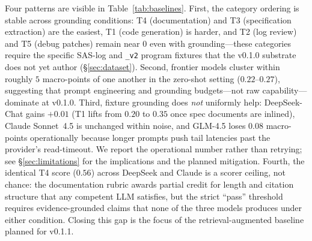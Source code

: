 Four patterns are visible in Table~\ref{tab:baselines}. First, the
category ordering is stable across grounding conditions: T4
(documentation) and T3 (specification extraction) are the easiest, T1
(code generation) is harder, and T2 (log review) and T5 (debug patches)
remain near $0$ even with grounding---these categories require the
specific SAS-log and \texttt{\_v2} program fixtures that the v0.1.0
substrate does not yet author (\S\ref{sec:dataset}). Second, frontier
models cluster within roughly $5$ macro-points of one another in the
zero-shot setting (\(0.22\)--\(0.27\)), suggesting that prompt
engineering and grounding budgets---not raw capability---dominate at
v0.1.0. Third, fixture grounding does \emph{not} uniformly help:
DeepSeek-Chat gains $+0.01$ (T1 lifts from $0.20$ to $0.35$ once spec
documents are inlined), Claude Sonnet~4.5 is unchanged within noise, and
GLM-4.5 loses $0.08$ macro-points operationally because longer prompts
push tail latencies past the provider's read-timeout. We report the
operational number rather than retrying; see \S\ref{sec:limitations} for
the implications and the planned mitigation. Fourth, the identical T4
score (\(0.56\)) across DeepSeek and Claude is a scorer ceiling, not
chance: the documentation rubric awards partial credit for length and
citation structure that any competent LLM satisfies, but the strict
``pass'' threshold requires evidence-grounded claims that none of the
three models produces under either condition. Closing this gap is the
focus of the retrieval-augmented baseline planned for v0.1.1.
